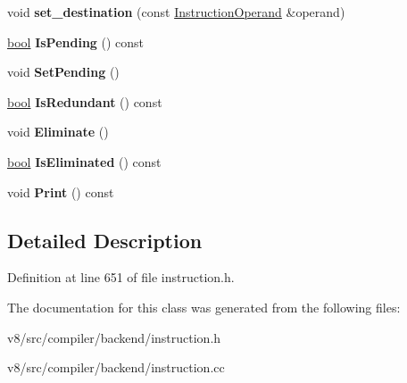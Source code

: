 \begin{DoxyCompactItemize}
\item 
\mbox{\label{classv8_1_1internal_1_1compiler_1_1MoveOperands_aae527d9ab8855c81ac7b3f0bfd6bb194}} 
void {\bfseries set\+\_\+destination} (const \mbox{\hyperlink{classv8_1_1internal_1_1compiler_1_1InstructionOperand}{Instruction\+Operand}} \&operand)
\item 
\mbox{\label{classv8_1_1internal_1_1compiler_1_1MoveOperands_a39fb0605f303f9e3856775f0275d970f}} 
\mbox{\hyperlink{classbool}{bool}} {\bfseries Is\+Pending} () const
\item 
\mbox{\label{classv8_1_1internal_1_1compiler_1_1MoveOperands_a3d1362a181883cd36934437dad57d429}} 
void {\bfseries Set\+Pending} ()
\item 
\mbox{\label{classv8_1_1internal_1_1compiler_1_1MoveOperands_a510625bf5eca0e4954d13abd8e8e71a3}} 
\mbox{\hyperlink{classbool}{bool}} {\bfseries Is\+Redundant} () const
\item 
\mbox{\label{classv8_1_1internal_1_1compiler_1_1MoveOperands_ab39953280d3cb4e1e68b76cbcf7665ab}} 
void {\bfseries Eliminate} ()
\item 
\mbox{\label{classv8_1_1internal_1_1compiler_1_1MoveOperands_add054c3c9c32b26a87795ff101d33311}} 
\mbox{\hyperlink{classbool}{bool}} {\bfseries Is\+Eliminated} () const
\item 
\mbox{\label{classv8_1_1internal_1_1compiler_1_1MoveOperands_aaf3151fc0ff164c6355b6ee11df9f8f8}} 
void {\bfseries Print} () const
\end{DoxyCompactItemize}


\subsection{Detailed Description}


Definition at line 651 of file instruction.\+h.



The documentation for this class was generated from the following files\+:\begin{DoxyCompactItemize}
\item 
v8/src/compiler/backend/instruction.\+h\item 
v8/src/compiler/backend/instruction.\+cc\end{DoxyCompactItemize}
